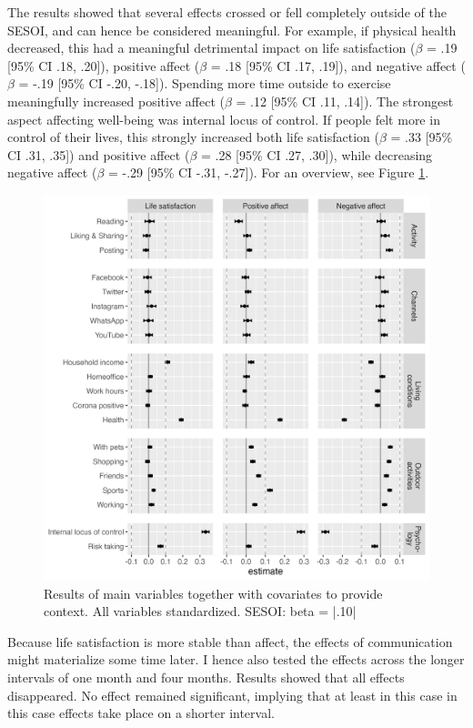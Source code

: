 \documentclass[
  man,mask,floatsintext]{apa7}
\begin{document}
The results showed that several effects crossed or fell completely outside of the SESOI, and can hence be considered meaningful.
For example, if physical health decreased, this had a meaningful detrimental impact on life satisfaction (\(\beta\) = .19 {[}95\% CI .18, .20{]}), positive affect (\(\beta\) = .18 {[}95\% CI .17, .19{]}), and negative affect (\(\beta\) = -.19 {[}95\% CI -.20, -.18{]}).
Spending more time outside to exercise meaningfully increased positive affect (\(\beta\) = .12 {[}95\% CI .11, .14{]}).
The strongest aspect affecting well-being was internal locus of control.
If people felt more in control of their lives, this strongly increased both life satisfaction (\(\beta\) = .33 {[}95\% CI .31, .35{]}) and
positive affect (\(\beta\) = .28 {[}95\% CI .27, .30{]}),
while decreasing negative affect (\(\beta\) = -.29 {[}95\% CI -.31, -.27{]}).
For an overview, see Figure \ref{fig:fig-control}.

\begin{figure}
\includegraphics[width=\textwidth]{figures/fig_results_comp_std} \caption{Results of main variables together with covariates to provide context. All variables standardized. SESOI: beta = |.10|}\label{fig:fig-control}
\end{figure}

Because life satisfaction is more stable than affect, the effects of communication might materialize some time later.
I hence also tested the effects across the longer intervals of one month and four months.
Results showed that all effects disappeared.
No effect remained significant, implying that at least in this case in this case effects take place on a shorter interval.
\end{document}
